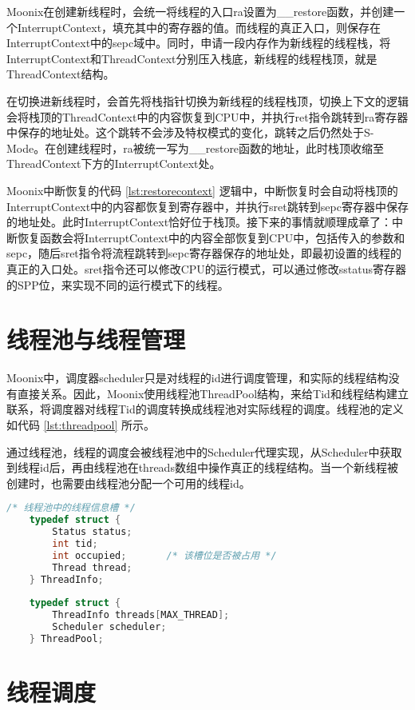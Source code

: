 Moonix在创建新线程时，会统一将线程的入口ra设置为\_\_restore函数，并创建一个InterruptContext，填充其中的寄存器的值。而线程的真正入口，则保存在InterruptContext中的sepc域中。同时，申请一段内存作为新线程的线程栈，将InterruptContext和ThreadContext分别压入栈底，新线程的线程栈顶，就是ThreadContext结构。

在切换进新线程时，会首先将栈指针切换为新线程的线程栈顶，切换上下文的逻辑会将栈顶的ThreadContext中的内容恢复到CPU中，并执行ret指令跳转到ra寄存器中保存的地址处。这个跳转不会涉及特权模式的变化，跳转之后仍然处于S-Mode。在创建线程时，ra被统一写为\_\_restore函数的地址，此时栈顶收缩至ThreadContext下方的InterruptContext处。

Moonix中断恢复的代码 \ref{lst:restorecontext} 逻辑中，中断恢复时会自动将栈顶的InterruptContext中的内容都恢复到寄存器中，并执行sret跳转到sepc寄存器中保存的地址处。此时InterruptContext恰好位于栈顶。接下来的事情就顺理成章了：中断恢复函数会将InterruptContext中的内容全部恢复到CPU中，包括传入的参数和sepc，随后sret指令将流程跳转到sepc寄存器保存的地址处，即最初设置的线程的真正的入口处。sret指令还可以修改CPU的运行模式，可以通过修改sstatus寄存器的SPP位，来实现不同的运行模式下的线程。

\section{线程池与线程管理}

Moonix中，调度器scheduler只是对线程的id进行调度管理，和实际的线程结构没有直接关系。因此，Moonix使用线程池ThreadPool结构，来给Tid和线程结构建立联系，将调度器对线程Tid的调度转换成线程池对实际线程的调度。线程池的定义如代码 \ref{lst:threadpool} 所示。

通过线程池，线程的调度会被线程池中的Scheduler代理实现，从Scheduler中获取到线程id后，再由线程池在threads数组中操作真正的线程结构。当一个新线程被创建时，也需要由线程池分配一个可用的线程id。

\begin{minipage}[c]{0.95\textwidth}
\begin{lstlisting}[language={C}, caption={线程池定义}, label={lst:threadpool}]
	/* 线程池中的线程信息槽 */
	typedef struct {
		Status status;
		int tid;
		int occupied;       /* 该槽位是否被占用 */
		Thread thread;
	} ThreadInfo;
	
	typedef struct {
		ThreadInfo threads[MAX_THREAD];
		Scheduler scheduler;
	} ThreadPool;
\end{lstlisting}
\end{minipage}

\section{线程调度}

